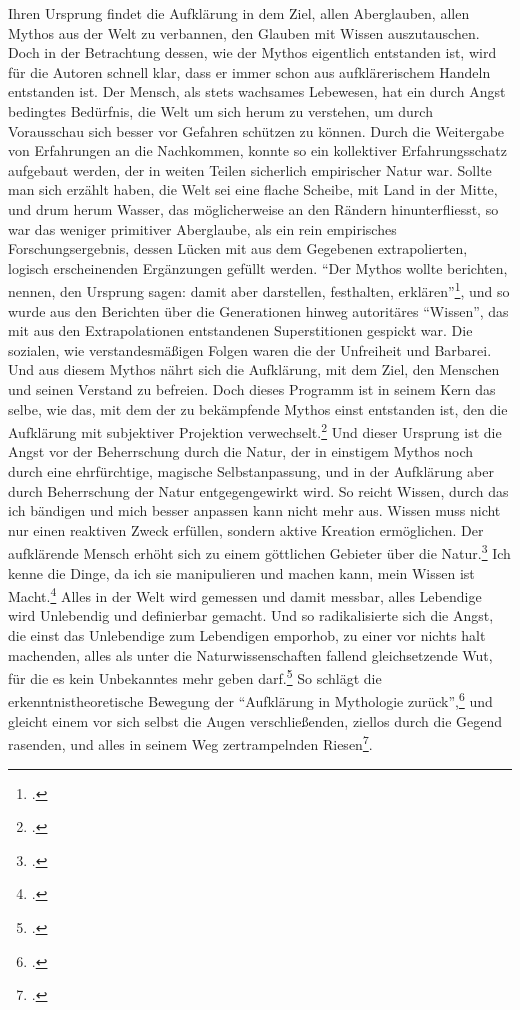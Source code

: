 \documentclass[a4paper, 12pt]{article}
\begin{document}
\begin{onehalfspace}
Ihren Ursprung findet die Aufklärung in dem Ziel, allen Aberglauben, allen Mythos aus der Welt zu verbannen, den Glauben mit Wissen auszutauschen. Doch in der Betrachtung dessen, wie der Mythos eigentlich entstanden ist, wird für die Autoren schnell klar, dass er immer schon aus aufklärerischem Handeln entstanden ist. Der Mensch, als stets wachsames Lebewesen, hat ein durch Angst bedingtes Bedürfnis, die Welt um sich herum zu verstehen, um durch Vorausschau sich besser vor Gefahren schützen zu können. Durch die Weitergabe von Erfahrungen an die Nachkommen, konnte so ein kollektiver Erfahrungsschatz aufgebaut werden, der in weiten Teilen sicherlich empirischer Natur war. Sollte man sich erzählt haben, die Welt sei eine flache Scheibe, mit Land in der Mitte, und drum herum Wasser, das möglicherweise an den Rändern hinunterfliesst, so war das weniger primitiver Aberglaube, als ein rein empirisches Forschungsergebnis, dessen Lücken mit aus dem Gegebenen extrapolierten, logisch erscheinenden Ergänzungen gefüllt werden. "`Der Mythos wollte berichten, nennen, den Ursprung sagen: damit aber darstellen, festhalten, erklären"'\footnote{\Cite[Siehe][S. 14]{dialektik-der-aufklaerung}.}, und so wurde aus den Berichten über die Generationen hinweg autoritäres "`Wissen"', das mit aus den Extrapolationen entstandenen Superstitionen gespickt war. Die sozialen, wie verstandesmäßigen Folgen waren die der Unfreiheit und Barbarei. Und aus diesem Mythos nährt sich die Aufklärung, mit dem Ziel, den Menschen und seinen Verstand zu befreien. Doch dieses Programm ist in seinem Kern das selbe, wie das, mit dem der zu bekämpfende Mythos einst entstanden ist, den die Aufklärung mit subjektiver Projektion verwechselt.\footnote{\Cite[Vgl.][S. 12]{dialektik-der-aufklaerung}.} Und dieser Ursprung ist die Angst vor der Beherrschung durch die Natur, der in einstigem Mythos noch durch eine ehrfürchtige, magische Selbstanpassung, und in der Aufklärung aber durch Beherrschung der Natur entgegengewirkt wird. So reicht Wissen, durch das ich bändigen und mich besser anpassen kann nicht mehr aus. Wissen muss nicht nur einen reaktiven Zweck erfüllen, sondern aktive Kreation ermöglichen. Der aufklärende Mensch erhöht sich zu einem göttlichen Gebieter über die Natur.\footnote{\Cite[Vgl.][S. 15]{dialektik-der-aufklaerung}.} Ich kenne die Dinge, da ich sie manipulieren und machen kann, mein Wissen ist Macht.\footnote{\Cite[Vgl.][S. 15]{dialektik-der-aufklaerung}.} Alles in der Welt wird gemessen und damit messbar, alles Lebendige wird Unlebendig und definierbar gemacht. Und so radikalisierte sich die Angst, die einst das Unlebendige zum Lebendigen emporhob, zu einer vor nichts halt machenden, alles als unter die Naturwissenschaften fallend gleichsetzende Wut, für die es kein Unbekanntes mehr geben darf.\footnote{\Cite[Vgl.][S. 22 f.]{dialektik-der-aufklaerung}.} So schlägt die erkenntnistheoretische Bewegung der "`Aufklärung in Mythologie zurück"',\footnote{\Cite[Siehe][S. 6]{dialektik-der-aufklaerung}.} und gleicht einem vor sich selbst die Augen verschließenden, ziellos durch die Gegend rasenden, und alles in seinem Weg zertrampelnden Riesen\footnote{\Cite[Vgl.][S. 25]{fortschritt}.}. 



\end{onehalfspace}
\end{document}
